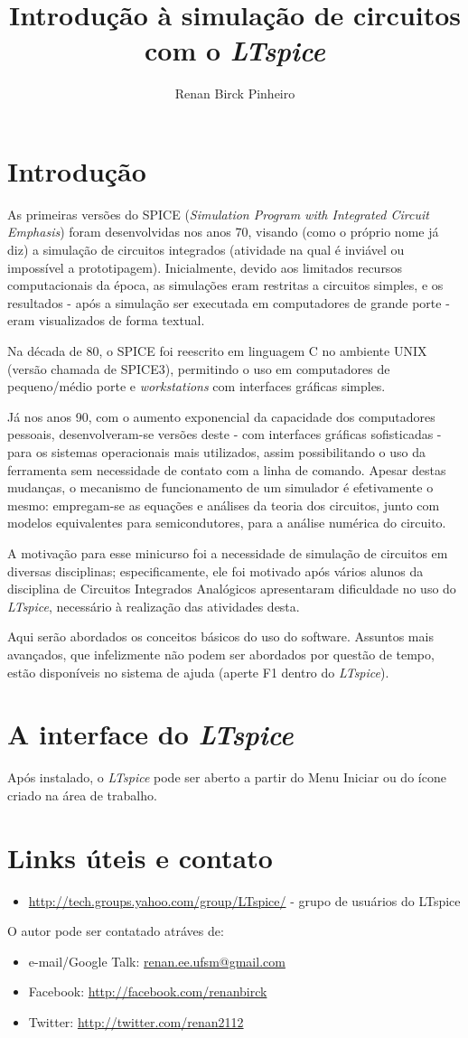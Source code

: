 \documentclass[]{report}
\title{\textbf{Introdução à simulação de circuitos com o \textit{LTspice}}}
\author{Renan Birck Pinheiro}
\begin{document}


\chapter{Introdução}
As primeiras versões do SPICE (\textit{Simulation Program with Integrated Circuit Emphasis}) foram desenvolvidas nos anos 70, visando (como o próprio nome já diz) a simulação de circuitos integrados (atividade na qual é inviável ou impossível a prototipagem). Inicialmente, devido aos limitados recursos computacionais da época, as simulações eram restritas a circuitos simples, e os resultados - após a simulação ser executada em computadores de grande porte - eram visualizados de forma textual.

Na década de 80, o SPICE foi reescrito em linguagem C no ambiente UNIX (versão chamada de SPICE3), permitindo o uso em computadores de pequeno/médio porte e \textit{workstations} com interfaces gráficas simples. 

Já nos anos 90, com o aumento exponencial da capacidade dos computadores pessoais, desenvolveram-se versões deste - com interfaces gráficas sofisticadas - para os sistemas operacionais mais utilizados, assim possibilitando o uso da ferramenta sem necessidade de contato com a linha de comando. Apesar destas mudanças, o mecanismo de funcionamento de um simulador é efetivamente o mesmo: empregam-se as equações e análises da teoria dos circuitos, junto com modelos equivalentes para semicondutores, para a análise numérica do circuito.

A motivação para esse minicurso foi a necessidade de simulação de circuitos em diversas disciplinas; especificamente, ele foi motivado após vários alunos da disciplina de Circuitos Integrados Analógicos apresentaram dificuldade no uso do \textit{LTspice}, necessário à realização das atividades desta.

Aqui serão abordados os conceitos básicos do uso do software. Assuntos mais avançados, que infelizmente não podem ser abordados por questão de tempo, estão disponíveis no sistema de ajuda (aperte F1 dentro do \textit{LTspice}).
\chapter{A interface do \textit{LTspice}}
Após instalado, o \textit{LTspice} pode ser aberto a partir do Menu Iniciar ou do ícone criado na área de trabalho. 

\chapter{Links úteis e contato}
\begin{itemize}
\item \url{http://tech.groups.yahoo.com/group/LTspice/} - grupo de usuários do LTspice
\end{itemize}

O autor pode ser contatado atráves de:

\begin{itemize}
\item e-mail/Google Talk: \url{renan.ee.ufsm@gmail.com}
\item Facebook: \url{http://facebook.com/renanbirck}
\item Twitter: \url{http://twitter.com/renan2112}
\end{itemize}
\end{document}
